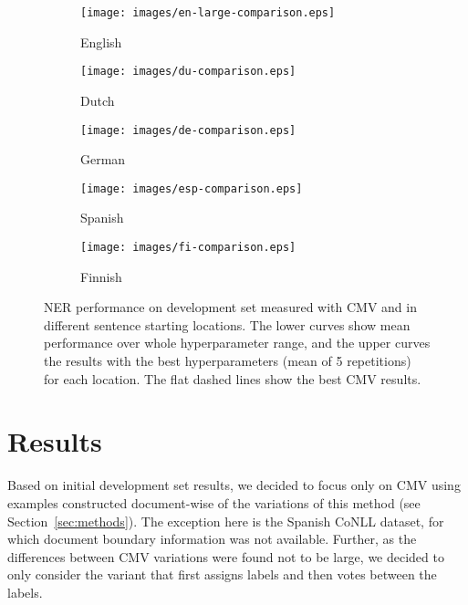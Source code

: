 \documentclass[11pt]{article}
\begin{document}
\begin{figure}[!t]
\begin{subfigure}{0.33\textwidth}
\texttt{[image: images/en-large-comparison.eps]} 
\caption{English}
\label{fig:subim1}
\end{subfigure}
\begin{subfigure}{0.33\textwidth}
\texttt{[image: images/du-comparison.eps]}
\caption{Dutch}
\label{fig:subim2}
\end{subfigure}
\begin{subfigure}{0.33\textwidth}
\texttt{[image: images/de-comparison.eps]} 
\caption{German}
\label{fig:subim3}
\end{subfigure}
\begin{subfigure}{0.33\textwidth}
\texttt{[image: images/esp-comparison.eps]}
\caption{Spanish}
\label{fig:subim4}
\end{subfigure}
\begin{subfigure}{0.33\textwidth}
\texttt{[image: images/fi-comparison.eps]}
\caption{Finnish}
\label{fig:subim5}
\end{subfigure}
\caption{NER performance on development set measured with CMV and in different sentence starting locations. The lower curves show mean performance over whole hyperparameter range, and the upper curves the results with the best hyperparameters (mean of 5 repetitions) for each location. The flat dashed lines show the best CMV results.}
\label{fig:image2}
\end{figure}

\section{Results}

Based on initial development set results, we decided to focus only on CMV using examples constructed document-wise of the variations of this method (see Section~\ref{sec:methods}). The exception here is the Spanish CoNLL dataset, for which document boundary information was not available. Further, as the differences between CMV variations were found not to be large, we decided to only consider the variant that first assigns labels and then votes between the labels. 
\end{document}
